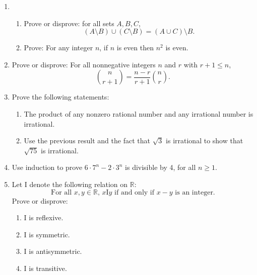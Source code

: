 \documentclass[12pt,letterpaper]{article}
\begin{document}
\begin{enumerate}

\newpage
\item \begin{enumerate}\item Prove or disprove:  for all sets $A,B,C$, 
\[(A\setminus B)\cup(C\setminus B)=(A\cup C)\setminus B.\]

\vspace{23pc}
\item Prove: For any integer $n$, if $n$ is even then $n^2$ is even.
\end{enumerate}

\newpage
\item Prove or disprove: For all nonnegative integers $n$ and $r$ with $r+1\leq n$, 
\[\binom{n}{r+1}=\frac{n-r}{r+1}\binom{n}{r}.\]

\newpage
\item Prove the following statements:
\begin{enumerate}
\item The product of any nonzero rational number and any irrational number is irrational.

\vspace{23pc}
\item Use the previous result and the fact that $\sqrt 3$ is irrational to show that $\sqrt{75}$ is irrational.

\end{enumerate}

\newpage
\item Use induction to prove $6\cdot 7^n-2\cdot 3^n$ is divisible by 4, for all $n\geq 1$.  

\newpage
\item Let I denote the following relation on $\mathbb R$:
\[\text{For all $x,y\in\mathbb R$, $x$I$y$ if and only if $x-y$ is an integer.}\]
Prove or disprove:
\begin{enumerate}
\item I is reflexive.

\vspace{6pc}
\item I is symmetric.

\vspace{6pc}
\item I is antisymmetric.

\vspace{6pc}
\item I is transitive.


\end{enumerate}
\end{enumerate}
\end{document}
